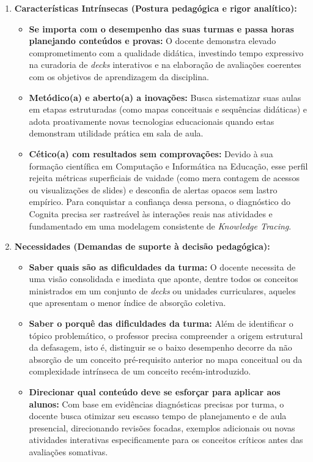 \begin{enumerate}
    \item \textbf{Características Intrínsecas (Postura pedagógica e rigor analítico):}
    \begin{itemize}
        \item \textbf{Se importa com o desempenho das suas turmas e passa horas planejando conteúdos e provas:} O docente demonstra elevado comprometimento com a qualidade didática, investindo tempo expressivo na curadoria de \textit{decks} interativos e na elaboração de avaliações coerentes com os objetivos de aprendizagem da disciplina.
        \item \textbf{Metódico(a) e aberto(a) a inovações:} Busca sistematizar suas aulas em etapas estruturadas (como mapas conceituais e sequências didáticas) e adota proativamente novas tecnologias educacionais quando estas demonstram utilidade prática em sala de aula.
        \item \textbf{Cético(a) com resultados sem comprovações:} Devido à sua formação científica em Computação e Informática na Educação, esse perfil rejeita métricas superficiais de vaidade (como mera contagem de acessos ou visualizações de slides) e desconfia de alertas opacos sem lastro empírico. Para conquistar a confiança dessa persona, o diagnóstico do Cognita precisa ser rastreável às interações reais nas atividades e fundamentado em uma modelagem consistente de \textit{Knowledge Tracing}.
    \end{itemize}

    \item \textbf{Necessidades (Demandas de suporte à decisão pedagógica):}
    \begin{itemize}
        \item \textbf{Saber quais são as dificuldades da turma:} O docente necessita de uma visão consolidada e imediata que aponte, dentre todos os conceitos ministrados em um conjunto de \textit{decks} ou unidades curriculares, aqueles que apresentam o menor índice de absorção coletiva.
        \item \textbf{Saber o porquê das dificuldades da turma:} Além de identificar o tópico problemático, o professor precisa compreender a origem estrutural da defasagem, isto é, distinguir se o baixo desempenho decorre da não absorção de um conceito pré-requisito anterior no mapa conceitual ou da complexidade intrínseca de um conceito recém-introduzido.
        \item \textbf{Direcionar qual conteúdo deve se esforçar para aplicar aos alunos:} Com base em evidências diagnósticas precisas por turma, o docente busca otimizar seu escasso tempo de planejamento e de aula presencial, direcionando revisões focadas, exemplos adicionais ou novas atividades interativas especificamente para os conceitos críticos antes das avaliações somativas.
    \end{itemize}
\end{enumerate}

